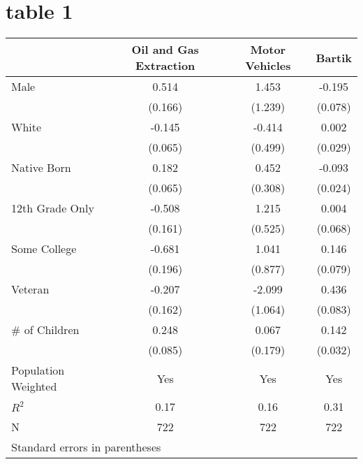 \documentclass{article}
\begin{document}
\section{table 1}
\begin{tabular}{l*{3}{c}}
\toprule
                &\multicolumn{1}{c}{Oil and Gas Extraction}&\multicolumn{1}{c}{Motor Vehicles}&\multicolumn{1}{c}{Bartik}\\
\midrule
Male            &    0.514&    1.453&   -0.195\\
                &  (0.166)&  (1.239)&  (0.078)\\
White           &   -0.145&   -0.414&    0.002\\
                &  (0.065)&  (0.499)&  (0.029)\\
Native Born     &    0.182&    0.452&   -0.093\\
                &  (0.065)&  (0.308)&  (0.024)\\
12th Grade Only &   -0.508&    1.215&    0.004\\
                &  (0.161)&  (0.525)&  (0.068)\\
Some College    &   -0.681&    1.041&    0.146\\
                &  (0.196)&  (0.877)&  (0.079)\\
Veteran         &   -0.207&   -2.099&    0.436\\
                &  (0.162)&  (1.064)&  (0.083)\\
\# of Children  &    0.248&    0.067&    0.142\\
                &  (0.085)&  (0.179)&  (0.032)\\
\midrule
Population Weighted&      Yes&      Yes&      Yes\\
$ R^2$          &     0.17&     0.16&     0.31\\
N               &      722&      722&      722\\
\bottomrule
\multicolumn{4}{l}{\footnotesize Standard errors in parentheses}\\
\end{tabular}
\end{document}
